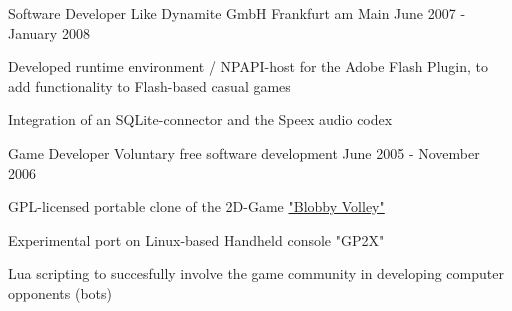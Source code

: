 \begin{cventries}
  \cventry
    {Software Developer} %
    {Like Dynamite GmbH} %
    {Frankfurt am Main} %
    {June 2007 - January 2008} %
    {
      \begin{cvitems} %
        \item {Developed runtime environment / NPAPI-host for the Adobe Flash Plugin, to add functionality to Flash-based casual games}
        \item {Integration of an SQLite-connector and the Speex audio codex}
      \end{cvitems}
    }

    \cventry
    {Game Developer} %
    {Voluntary free software development} %
    {} %
    {June 2005 - November 2006} %
    {
      \begin{cvitems} %
        \item {GPL-licensed portable clone of the 2D-Game \href{https://de.wikipedia.org/wiki/Blobby_Volley\#Blobby_Volley_2}{"Blobby Volley"} \acvHeaderIconSep \faWikipediaW}
        \item {Experimental port on Linux-based Handheld console "GP2X"}
        \item {Lua scripting to succesfully involve the game community in developing computer opponents (bots)}
      \end{cvitems}
    }

\end{cventries}
